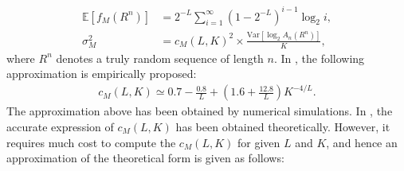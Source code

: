 \begin{align}
	\mathbb{E}[f_M(R^n)]  &= 2^{-L}\sum_{i=1}^{\infty}(1-2^{-L})^{i-1} \log_2 i \label{eq:mean_maurer},\\
	\sigma_M^2 &= c_M(L,K)^2 \times \frac{\mathrm{Var}[\log_2 A_n(R^n)]}{K} \label{eq:sigma_maurer},
\end{align}
%
where $R^n$ denotes a truly random sequence of length $n$. 
%
In \cite{maurer1992universal}, the following approximation is empirically proposed:
\begin{align}\label{eq:cM_maurer}
	c_M(L,K) \simeq 0.7 - \frac{0.8}{L} + \left( 1.6 + \frac{12.8}{L} \right) K^{-4/L}.
\end{align}
The approximation above has been obtained by numerical simulations. 
%
In \cite{coron1998accurate}, the accurate expression of $c_M(L,K)$ has been obtained theoretically. 
However, it requires much cost to compute the $c_M(L,K)$ for given $L$ and $K$, and hence an approximation of the theoretical form is given as follows:

